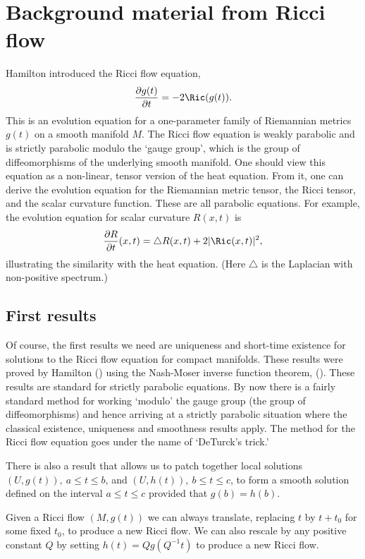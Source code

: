 \section{Background material from Ricci flow}

Hamilton \cite{Hamilton3MPRC} introduced the Ricci flow
equation,
$$\frac{\partial g(t)}{\partial t}=-2\Ric(g(t)).$$
This is an evolution equation for a one-parameter family of Riemannian metrics
$g(t)$ on a smooth manifold $M$. The Ricci flow equation is weakly parabolic
and is strictly parabolic modulo the `gauge group', which is the group of
diffeomorphisms of the underlying smooth manifold. One should view this
equation as a non-linear, tensor version of the heat equation. From it, one can
derive the evolution equation for the Riemannian metric tensor, the Ricci
tensor, and the scalar curvature function. These are all parabolic equations.
For example, the evolution equation for scalar curvature $R(x,t)$ is
\begin{equation}\label{scalarflow} \frac{\partial R}{\partial t}(x,t)=\triangle
R(x,t)+2|\Ric(x,t)|^2, \end{equation} illustrating the
similarity with the heat equation. (Here $\triangle$ is the
Laplacian with non-positive spectrum.)

\subsection{First results}

Of course, the first results we need are uniqueness and short-time existence
for solutions to the Ricci flow equation for compact manifolds. These results
were proved by Hamilton (\cite{Hamilton3MPRC}) using the Nash-Moser inverse
function theorem,
 (\cite{HamiltonIFTNM}). These results are standard for
strictly parabolic equations. By now there is a fairly standard method for
working `modulo' the gauge group (the group of diffeomorphisms) and hence
arriving at a strictly parabolic situation where the classical existence,
uniqueness and smoothness results apply. The method for the Ricci flow equation
goes under the name of `DeTurck's trick.'

There is also a result that allows us to patch together local solutions
$(U,g(t)),\ a\le t\le b$, and $(U,h(t)),\ b\le t\le c$, to form a smooth
solution defined on the interval $a\le t\le c$ provided that $g(b)=h(b)$.

Given a Ricci flow $(M,g(t))$ we can always translate, replacing $t$
by $t+t_0$ for some fixed $t_0$, to produce a new Ricci flow. We can
also rescale by any positive constant $Q$ by setting
$h(t)=Qg(Q^{-1}t)$ to produce a new Ricci flow.



